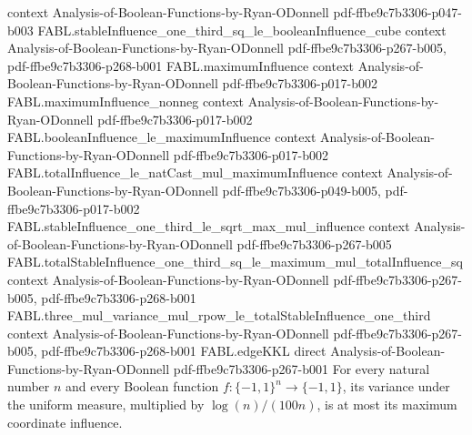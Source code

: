 \begin{theorem}
  {context}
  {Analysis-of-Boolean-Functions-by-Ryan-ODonnell}
  {pdf-ffbe9c7b3306-p047-b003}
\proofstep
  {FABL.stableInfluence_one_third_sq_le_booleanInfluence_cube}
  {context}
  {Analysis-of-Boolean-Functions-by-Ryan-ODonnell}
  {pdf-ffbe9c7b3306-p267-b005,
    pdf-ffbe9c7b3306-p268-b001}
\proofstep
  {FABL.maximumInfluence}
  {context}
  {Analysis-of-Boolean-Functions-by-Ryan-ODonnell}
  {pdf-ffbe9c7b3306-p017-b002}
\proofstep
  {FABL.maximumInfluence_nonneg}
  {context}
  {Analysis-of-Boolean-Functions-by-Ryan-ODonnell}
  {pdf-ffbe9c7b3306-p017-b002}
\proofstep
  {FABL.booleanInfluence_le_maximumInfluence}
  {context}
  {Analysis-of-Boolean-Functions-by-Ryan-ODonnell}
  {pdf-ffbe9c7b3306-p017-b002}
\proofstep
  {FABL.totalInfluence_le_natCast_mul_maximumInfluence}
  {context}
  {Analysis-of-Boolean-Functions-by-Ryan-ODonnell}
  {pdf-ffbe9c7b3306-p049-b005,
    pdf-ffbe9c7b3306-p017-b002}
\proofstep
  {FABL.stableInfluence_one_third_le_sqrt_max_mul_influence}
  {context}
  {Analysis-of-Boolean-Functions-by-Ryan-ODonnell}
  {pdf-ffbe9c7b3306-p267-b005}
\proofstep
  {FABL.totalStableInfluence_one_third_sq_le_maximum_mul_totalInfluence_sq}
  {context}
  {Analysis-of-Boolean-Functions-by-Ryan-ODonnell}
  {pdf-ffbe9c7b3306-p267-b005,
    pdf-ffbe9c7b3306-p268-b001}
\proofstep
  {FABL.three_mul_variance_mul_rpow_le_totalStableInfluence_one_third}
  {context}
  {Analysis-of-Boolean-Functions-by-Ryan-ODonnell}
  {pdf-ffbe9c7b3306-p267-b005,
    pdf-ffbe9c7b3306-p268-b001}
\proofstep
  {FABL.edgeKKL}
  {direct}
  {Analysis-of-Boolean-Functions-by-Ryan-ODonnell}
  {pdf-ffbe9c7b3306-p267-b001}
For every natural number $n$ and every Boolean function $f:\{−1,1\}^n\to\{−1,1\}$, its
variance under the uniform measure, multiplied by $\log(n)/(100n)$, is at most its
maximum coordinate influence.
\end{theorem}
